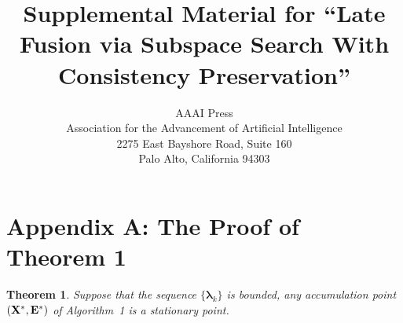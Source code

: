 \documentclass[letterpaper]{article}
\newtheorem{theorem}{Theorem}
\def\bE{{\bf E}}
\def\blambda{{\bm \lambda}}
\def\bX{{\bf X}}
\def\bX{{\bf X}}
\begin{document}
%



\title{Supplemental Material for ``Late Fusion via Subspace Search With Consistency Preservation''}

\author{AAAI Press\\
Association for the Advancement of Artificial Intelligence\\
2275 East Bayshore Road, Suite 160\\
Palo Alto, California 94303\\
}



\maketitle



\section{Appendix A: The Proof of Theorem 1}

\begin{theorem}\label{theorem:alm_convergence}
  Suppose that the sequence $\{ \blambda_{k} \}$ is bounded, any accumulation point $(\bX^*, \bE^*)$ of Algorithm~1 is a stationary point.
\end{theorem}
\end{document}
